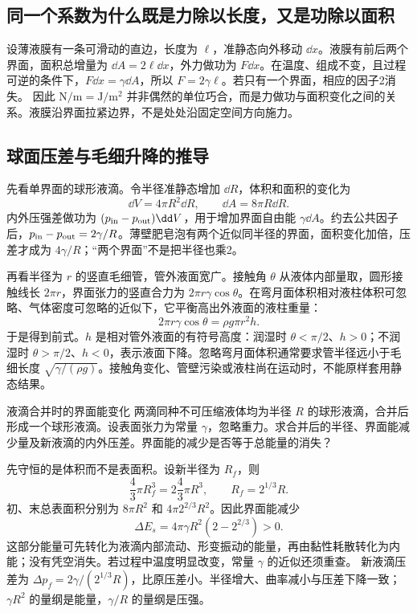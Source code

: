 \subsection{同一个系数为什么既是力除以长度，又是功除以面积}
设薄液膜有一条可滑动的直边，长度为 $\ell$，准静态向外移动 $\dd x$。液膜有前后两个界面，面积总增量为 $\dd A=2\ell\dd x$，外力做功为 $F\dd x$。在温度、组成不变，且过程可逆的条件下，$F\dd x=\gamma\dd A$，所以 $F=2\gamma\ell$。若只有一个界面，相应的因子2消失。
因此 $\mathrm{N/m}=\mathrm{J/m^2}$ 并非偶然的单位巧合，而是力做功与面积变化之间的关系。液膜沿界面拉紧边界，不是处处沿固定空间方向施力。

\subsection{球面压差与毛细升降的推导}
先看单界面的球形液滴。令半径准静态增加 $\dd R$，体积和面积的变化为
\[
 \dd V=4\pi R^2\dd R,\qquad \dd A=8\pi R\dd R.
\]
内外压强差做功为 $(p_{\rm in}-p_{\rm out})\dd V$，用于增加界面自由能 $\gamma\dd A$。约去公共因子后，$p_{\rm in}-p_{\rm out}=2\gamma/R$。薄壁肥皂泡有两个近似同半径的界面，面积变化加倍，压差才成为 $4\gamma/R$；“两个界面”不是把半径也乘2。

再看半径为 $r$ 的竖直毛细管，管外液面宽广。接触角 $\theta$ 从液体内部量取，圆形接触线长 $2\pi r$，界面张力的竖直合力为 $2\pi r\gamma\cos\theta$。在弯月面体积相对液柱体积可忽略、气体密度可忽略的近似下，它平衡高出外液面的液柱重量：
\[
 2\pi r\gamma\cos\theta=\rho g\pi r^2h.
\]
于是得到前式。$h$ 是相对管外液面的有符号高度：润湿时 $\theta<\pi/2$、$h>0$；不润湿时 $\theta>\pi/2$、$h<0$，表示液面下降。忽略弯月面体积通常要求管半径远小于毛细长度 $\sqrt{\gamma/(\rho g)}$。接触角变化、管壁污染或液柱尚在运动时，不能原样套用静态结果。

\begin{origexamplebox}{液滴合并时的界面能变化}\label{ch13:ex:teaching-droplets}
两滴同种不可压缩液体均为半径 $R$ 的球形液滴，合并后形成一个球形液滴。设表面张力为常量 $\gamma$，忽略重力。求合并后的半径、界面能减少量及新液滴的内外压差。界面能的减少是否等于总能量的消失？
\end{origexamplebox}
\begin{xesolution}
先守恒的是体积而不是表面积。设新半径为 $R_f$，则
\[
 \frac43\pi R_f^3=2\frac43\pi R^3,
 \qquad R_f=2^{1/3}R.
\]
初、末总表面积分别为 $8\pi R^2$ 和 $4\pi 2^{2/3}R^2$。因此界面能减少
\[
 \Delta E_s=4\pi\gamma R^2(2-2^{2/3})>0.
\]
这部分能量可先转化为液滴内部流动、形变振动的能量，再由黏性耗散转化为内能；没有凭空消失。若过程中温度明显改变，常量 $\gamma$ 的近似还须重查。
新液滴压差为 $\Delta p_f=2\gamma/(2^{1/3}R)$，比原压差小。半径增大、曲率减小与压差下降一致；$\gamma R^2$ 的量纲是能量，$\gamma/R$ 的量纲是压强。
\end{xesolution}
